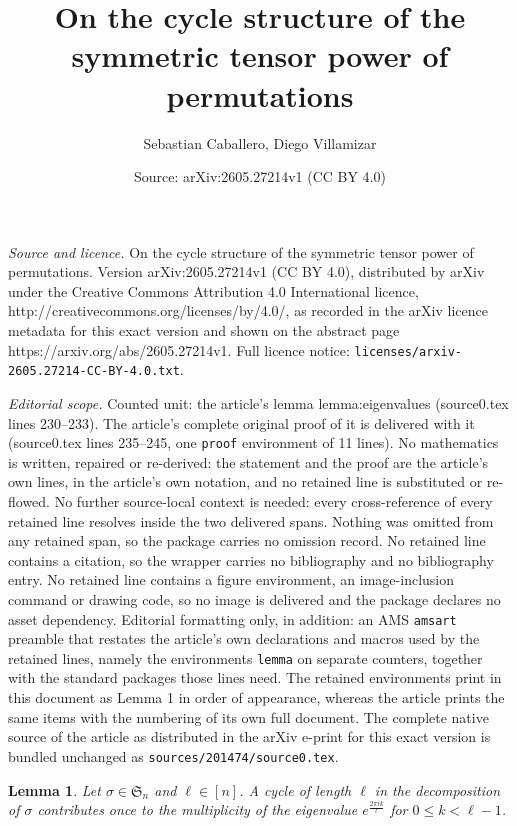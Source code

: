 \documentclass[10pt,a4paper]{amsart}
\title{On the cycle structure of the symmetric tensor power of permutations}
\author{Sebastian Caballero, Diego Villamizar}
\date{Source: arXiv:2605.27214v1 (CC BY 4.0)}
\newtheorem{lemma}{Lemma}
\begin{document}
\maketitle

\noindent\emph{Source and licence.} On the cycle structure of the symmetric tensor power of permutations. Version arXiv:2605.27214v1 (CC BY 4.0), distributed by arXiv under the Creative Commons Attribution 4.0 International licence, http://creativecommons.org/licenses/by/4.0/, as recorded in the arXiv licence metadata for this exact version and shown on the abstract page https://arxiv.org/abs/2605.27214v1. Full licence notice: \texttt{licenses/arxiv-2605.27214-CC-BY-4.0.txt}.\par\smallskip

\noindent\textit{Editorial scope.} Counted unit: the article's lemma lemma:eigenvalues (source0.tex lines 230--233). The article's complete original proof of it is delivered with it (source0.tex lines 235--245, one \texttt{proof} environment of 11 lines). No mathematics is written, repaired or re-derived: the statement and the proof are the article's own lines, in the article's own notation, and no retained line is substituted or re-flowed.  No further source-local context is needed: every cross-reference of every retained line resolves inside the two delivered spans.  Nothing was omitted from any retained span, so the package carries no omission record.  No retained line contains a citation, so the wrapper carries no bibliography and no bibliography entry.  No retained line contains a figure environment, an image-inclusion command or drawing code, so no image is delivered and the package declares no asset dependency.  Editorial formatting only, in addition: an AMS \texttt{amsart} preamble that restates the article's own declarations and macros used by the retained lines, namely the environments \texttt{lemma} on separate counters, together with the standard packages those lines need.  The retained environments print in this document as Lemma 1 in order of appearance, whereas the article prints the same items with the numbering of its own full document.  The complete native source of the article as distributed in the arXiv e-print for this exact version is bundled unchanged as \texttt{sources/201474/source0.tex}.
    \begin{lemma}
    \label{lemma:eigenvalues}
        Let $\sigma \in \mathfrak{S}_n$ and $\ell \in [n]$. A cycle of length $\ell$ in the decomposition of $\sigma$ contributes once to the multiplicity of the eigenvalue $e^{\frac{2\pi i k}{\ell}}$ for $0 \le k < \ell-1$.
    \end{lemma}
\end{document}
